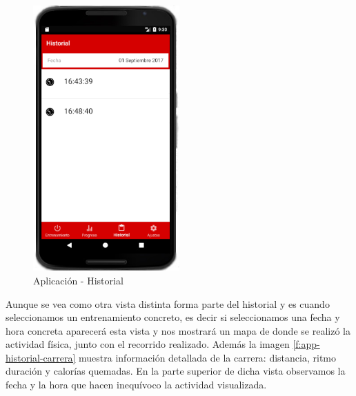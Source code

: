 \documentclass[a4paper, 11pt]{article}
\begin{document}
\begin{itemize}
                                \begin{figure}[H]
                                 \centering
                                 \includegraphics[width=0.5\textwidth]{8historial-lista}
                                 \caption{Aplicación - Historial}
                                 \label{f:app-historial-lista}
                                \end{figure}

      Aunque se vea como otra vista distinta forma parte del historial y es cuando seleccionamos un entrenamiento
      concreto, es decir si seleccionamos una fecha y hora concreta aparecerá esta vista y nos mostrará un mapa
      de donde se realizó la actividad física, junto con el recorrido realizado. Además la imagen
      \ref{f:app-historial-carrera} muestra información detallada de la carrera: distancia, ritmo duración y
      calorías quemadas. En la parte superior de dicha vista observamos la fecha y la hora que hacen inequívoco la
      actividad visualizada.\\


\end{itemize}
\end{document}
